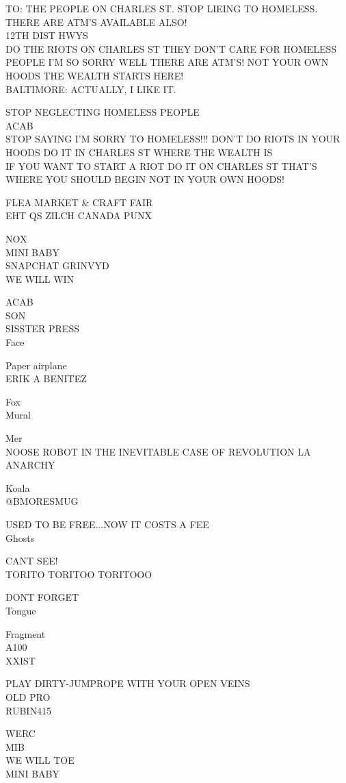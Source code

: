 \documentclass[10pt,letterpaper]{article}
\begin{document}
TO: THE PEOPLE ON CHARLES ST. STOP LIEING TO HOMELESS.  THERE ARE ATM'S AVAILABLE ALSO!\\
12TH DIST HWYS\\
DO THE RIOTS ON CHARLES ST THEY DON'T CARE FOR HOMELESS PEOPLE I'M SO SORRY WELL THERE ARE ATM'S!  NOT YOUR OWN HOODS THE WEALTH STARTS HERE!\\
BALTIMORE: ACTUALLY, I LIKE IT.

STOP NEGLECTING HOMELESS PEOPLE\\
ACAB\\
STOP SAYING I'M SORRY TO HOMELESS!!!  DON'T DO RIOTS IN YOUR HOODS DO IT IN CHARLES ST WHERE THE WEALTH IS\\
IF YOU WANT TO START A RIOT DO IT ON CHARLES ST THAT'S WHERE YOU SHOULD BEGIN NOT IN YOUR OWN HOODS!

FLEA MARKET \& CRAFT FAIR\\
EHT QS ZILCH CANADA PUNX

NOX\\
MINI BABY\\
SNAPCHAT GRINVYD\\
WE WILL WIN

ACAB\\
SON\\
SISSTER PRESS\\
Face

Paper airplane\\
ERIK A BENITEZ

Fox\\
Mural

Mer\\
NOOSE ROBOT IN THE INEVITABLE CASE OF REVOLUTION LA ANARCHY

Koala\\
@BMORESMUG

USED TO BE FREE...NOW IT COSTS A FEE\\
Ghosts

CANT SEE!\\
TORITO TORITOO TORITOOO

DONT FORGET\\
Tongue

Fragment\\
A100\\
XXIST

PLAY DIRTY{-}JUMPROPE WITH YOUR OPEN VEINS\\
OLD PRO\\
RUBIN415

WERC\\
MIB\\
WE WILL TOE\\
MINI BABY
\end{document}
